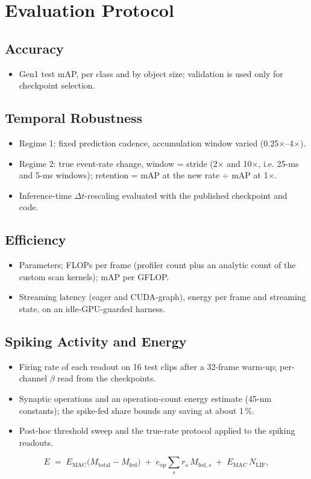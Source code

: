 \documentclass[11pt, a4paper]{report}
\newcommand{\Dt}{$\Delta t$}
\begin{document}
\section{Evaluation Protocol}
\label{sec:eval_protocol}
\subsection{Accuracy}
\begin{itemize}
  \item Gen1 test mAP, per class and by object size; validation is used only for checkpoint selection.
\end{itemize}

\subsection{Temporal Robustness}
\begin{itemize}
  \item Regime 1: fixed prediction cadence, accumulation window varied (0.25$\times$--4$\times$).
  \item Regime 2: true event-rate change, window = stride (2$\times$ and 10$\times$, i.e. 25-ms and 5-ms windows); retention = mAP at the new rate $\div$ mAP at 1$\times$.
  \item Inference-time \Dt{}-rescaling evaluated with the published checkpoint and code.
\end{itemize}

\subsection{Efficiency}
\begin{itemize}
  \item Parameters; FLOPs per frame (profiler count plus an analytic count of the custom scan kernels); mAP per GFLOP.
  \item Streaming latency (eager and CUDA-graph), energy per frame and streaming state, on an idle-GPU-guarded harness.
\end{itemize}

\subsection{Spiking Activity and Energy}
\begin{itemize}
  \item Firing rate of each readout on 16 test clips after a 32-frame warm-up; per-channel $\beta$ read from the checkpoints.
  \item Synaptic operations and an operation-count energy estimate (45-nm constants); the spike-fed share bounds any saving at about 1\,\%.
  \item Post-hoc threshold sweep and the true-rate protocol applied to the spiking readouts.
\end{itemize}
\begin{equation}
  E \;=\; E_{\mathrm{MAC}}\big(M_{\mathrm{total}} - M_{\mathrm{fed}}\big)
     \;+\; e_{\mathrm{op}} \sum_{s} r_s\, M_{\mathrm{fed},s}
     \;+\; E_{\mathrm{MAC}}\, N_{\mathrm{LIF}},
  \label{eq:sop_energy}
\end{equation}
\end{document}
